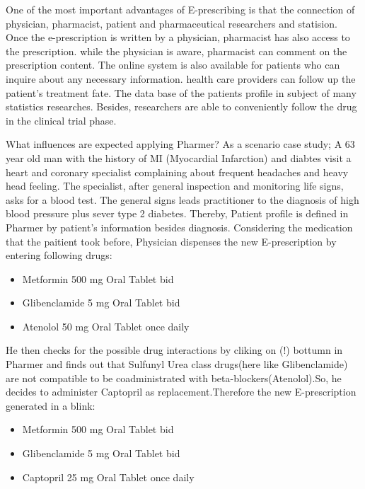 \documentclass[10pt, conference, compsocconf]{IEEEtran}
\begin{document}
One of the most important advantages of E-prescribing is that the connection of physician, pharmacist, patient and pharmaceutical researchers and statision.
Once the e-prescription is written by a physician, pharmacist has also access to the prescription.
while the physician is aware, pharmacist can comment on the prescription content.
The online system is also available for patients who can inquire about any necessary information.
health care providers can follow up the patient's treatment fate.
The data base of the patients profile in subject of many statistics researches.
Besides, researchers are able to conveniently follow the drug in the clinical trial phase.

What influences are expected applying Pharmer?
As a scenario case study; A 63 year old man with the history of MI (Myocardial Infarction) and diabtes visit a heart and coronary specialist complaining about frequent headaches and heavy head feeling. The specialist, after general inspection and monitoring life signs, asks for a blood test. The general signs leads practitioner to the diagnosis of high blood pressure plus sever type 2 diabetes. Thereby, Patient profile is defined in Pharmer by patient's information besides diagnosis. Considering the medication that the paitient took before, Physician dispenses the new E-prescription by entering following drugs:

\begin{itemize}
\item {Metformin} 500 mg Oral Tablet bid
\item {Glibenclamide} 5 mg Oral Tablet bid
\item {Atenolol} 50 mg Oral Tablet once daily
\end{itemize}

He then checks for the possible drug interactions by cliking on (!) bottumn in Pharmer and finds out that Sulfunyl Urea class drugs(here like Glibenclamide) are not compatible to be coadministrated with beta-blockers(Atenolol).So, he decides to administer Captopril as replacement.Therefore the new E-prescription generated in a blink:

\begin{itemize}
\item {Metformin} 500 mg Oral Tablet bid
\item {Glibenclamide} 5 mg Oral Tablet bid
\item {Captopril} 25 mg Oral Tablet once daily
\end{itemize}
\end{document}
